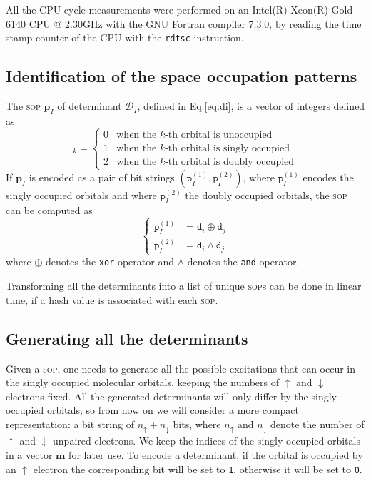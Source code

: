 \documentclass[aip,jcp,reprint,showkeys]{revtex4-1}
\newcommand{\md}{\mathtt{d}}
\newcommand{\mD}{\mathcal{D}}
\newcommand{\mpp}{\mathtt{p}}
\newcommand{\mpv}{\mathbf{p}}
\newcommand{\up}{\uparrow}
\newcommand{\dn}{\downarrow}
\newcommand{\one}{{\texttt{1}}}
\newcommand{\zero}{{\texttt{0}}}
\newcommand{\sop}{\textsc{sop}}
\begin{document}
All the CPU cycle measurements were performed  on an Intel(R) Xeon(R)
Gold 6140 CPU @ 2.30GHz with the GNU Fortran compiler 7.3.0, by reading
the time stamp counter of the CPU with the \texttt{rdtsc} instruction.


\subsection{Identification of the space occupation patterns}

The {\sop} $\mpv_I$ of determinant $\mD_I$, 
defined in Eq.\eqref{eq:di},
is a vector of integers defined as
\begin{equation}
  [\mpv_I]_k = 
  \begin{cases} 
    0 & \text{when the $k$-th orbital is unoccupied} \\
    1 & \text{when the $k$-th orbital is singly occupied} \\
    2 & \text{when the $k$-th orbital is doubly occupied}
  \end{cases} 
\end{equation}
If $\mpv_I$ is encoded as a pair of bit strings $(\mpp_I^{(1)}, \mpp_I^{(2)})$, where
$\mpp_I^{(1)}$ encodes the singly occupied orbitals and where $\mpp_I^{(2)}$ the doubly
occupied orbitals, the {\sop} can be computed as
\begin{equation}
\label{eq:sop}
\begin{cases}
  \mpp_I^{(1)} & = \md_i \oplus \md_j \\
  \mpp_I^{(2)} & = \md_i \wedge \md_j 
  \end{cases} 
\end{equation}
where $\oplus$ denotes the \texttt{xor} operator and $\wedge$ denotes the
\texttt{and} operator.

Transforming all the determinants into a list of unique \sop s can be done
in linear time, if a hash value is associated with each \sop .\cite{Bitton_1983}


\subsection{Generating all the determinants}


Given a {\sop}, one needs to generate all the possible excitations that can
occur in the singly occupied molecular orbitals, keeping the numbers of $\up$
and $\dn$ electrons fixed.
All the generated determinants will only differ by the singly occupied orbitals,
so from now on we will consider a more compact representation: a bit string of
$n_\up + n_\dn$ bits, where $n_\up$ and $n_\dn$ denote the number of $\up$ and
$\dn$ unpaired electrons. We keep the indices of the singly occupied orbitals
in a vector $\mathbf{m}$ for later use.
To encode a determinant, if the orbital is occupied by an $\up$ electron the
corresponding bit will be set to \one{}, otherwise it will be set to \zero{}.
\end{document}
